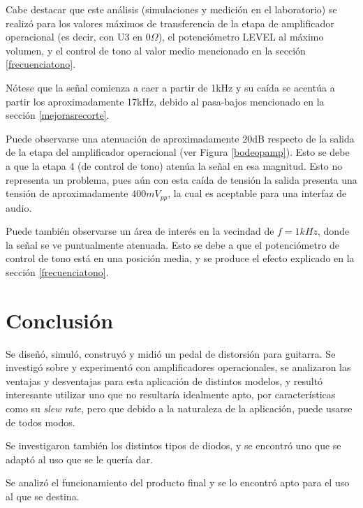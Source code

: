 Cabe destacar que este análisis (simulaciones y medición en el laboratorio) se realizó para los valores máximos de transferencia de la etapa de amplificador operacional (es decir, con U3 en $0\Omega$), el potenciómetro LEVEL al máximo volumen, y el control de tono al valor medio mencionado en la sección \ref{frecuenciatono}.

Nótese que la señal comienza a caer a partir de 1kHz y su caída se acentúa a partir los aproximadamente 17kHz, debido al pasa-bajos mencionado en la sección \ref{mejorasrecorte}.

Puede observarse una atenuación de aproximadamente 20dB respecto de la salida de la etapa del amplificador operacional (ver Figura \ref{bodeopamp}). Esto se debe a que la etapa 4 (de control de tono) atenúa la señal en esa magnitud. Esto no representa un problema, pues aún con esta caída de tensión la salida presenta una tensión de aproximadamente $400mV_{pp}$, la cual es aceptable para una interfaz de audio.

Puede también observarse un área de interés en la vecindad de $f=1kHz$, donde la señal se ve puntualmente atenuada. Esto se debe a que el potenciómetro de control de tono está en una posición media, y se produce el efecto explicado en la sección \ref{frecuenciatono}.

\section{Conclusión}
Se diseñó, simuló, construyó y midió un pedal de distorsión para guitarra. Se investigó sobre y experimentó con amplificadores operacionales, se analizaron las ventajas y desventajas para esta aplicación de distintos modelos, y resultó interesante utilizar uno que no resultaría idealmente apto, por características como su \emph{slew rate}, pero que debido a la naturaleza de la aplicación, puede usarse de todos modos.

Se investigaron también los distintos tipos de diodos, y se encontró uno que se adaptó al uso que se le quería dar.

Se analizó el funcionamiento del producto final y se lo encontró apto para el uso al que se destina.
